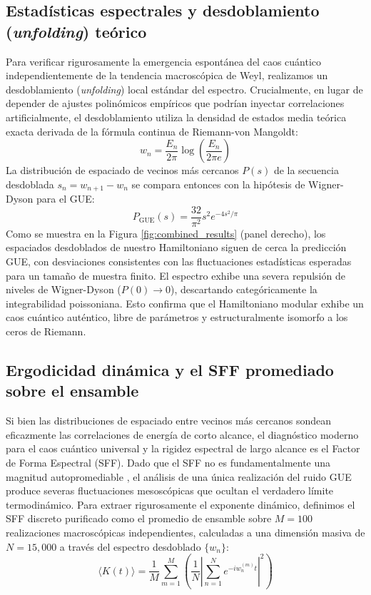 \documentclass[aps,prl,preprint,superscriptaddress,floatfix]{revtex4-2}
\begin{document}
\subsection{Estadísticas espectrales y desdoblamiento (\textit{unfolding}) teórico}
Para verificar rigurosamente la emergencia espontánea del caos cuántico independientemente de la tendencia macroscópica de Weyl, realizamos un desdoblamiento (\textit{unfolding}) local estándar del espectro. Crucialmente, en lugar de depender de ajustes polinómicos empíricos que podrían inyectar correlaciones artificialmente, el desdoblamiento utiliza la densidad de estados media teórica exacta derivada de la fórmula continua de Riemann-von Mangoldt:
\begin{equation}
w_n = \frac{E_n}{2\pi} \log\left(\frac{E_n}{2\pi e}\right)
\end{equation}
La distribución de espaciado de vecinos más cercanos $P(s)$ de la secuencia desdoblada $s_n = w_{n+1} - w_n$ se compara entonces con la hipótesis de Wigner-Dyson para el GUE:
\begin{equation}
P_{\text{GUE}}(s) = \frac{32}{\pi^2} s^2 e^{-4s^2/\pi}
\end{equation}
Como se muestra en la Figura \ref{fig:combined_results} (panel derecho), los espaciados desdoblados de nuestro Hamiltoniano siguen de cerca la predicción GUE, con desviaciones consistentes con las fluctuaciones estadísticas esperadas para un tamaño de muestra finito. El espectro exhibe una severa repulsión de niveles de Wigner-Dyson ($P(0) \to 0$), descartando categóricamente la integrabilidad poissoniana. Esto confirma que el Hamiltoniano modular exhibe un caos cuántico auténtico, libre de parámetros y estructuralmente isomorfo a los ceros de Riemann.

\subsection{Ergodicidad dinámica y el SFF promediado sobre el ensamble}

Si bien las distribuciones de espaciado entre vecinos más cercanos sondean eficazmente las correlaciones de energía de corto alcance, el diagnóstico moderno para el caos cuántico universal y la rigidez espectral de largo alcance es el Factor de Forma Espectral (SFF). Dado que el SFF no es fundamentalmente una magnitud autopromediable \cite{Cotler2017, Saad2019}, el análisis de una única realización del ruido GUE produce severas fluctuaciones mesoscópicas que ocultan el verdadero límite termodinámico. Para extraer rigurosamente el exponente dinámico, definimos el SFF discreto purificado como el promedio de ensamble sobre $M=100$ realizaciones macroscópicas independientes, calculadas a una dimensión masiva de $N=15,000$ a través del espectro desdoblado $\{w_n\}$:
\begin{equation}
\langle K(t) \rangle = \frac{1}{M} \sum_{m=1}^{M} \left( \frac{1}{N} \left| \sum_{n=1}^N e^{-i w_n^{(m)} t} \right|^2 \right)
\end{equation}
\end{document}
